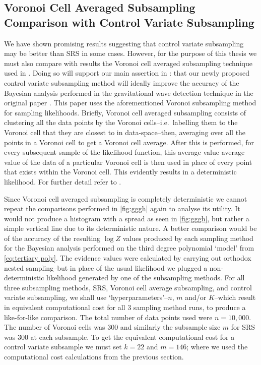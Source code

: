 \subsection{Voronoi Cell Averaged Subsampling Comparison with Control Variate Subsampling}\label{sec:voronoi}


We have shown promising results suggesting that control variate subsampling may be better than SRS in some cases. However, for the purpose of this thesis we must also compare with results the Voronoi cell averaged subsampling technique used in \cite{Mihaylov_2020}. Doing so will support our main assertion in : that our newly proposed control variate subsampling method will ideally improve the accuracy of the Bayesian analysis performed in the gravitational wave detection technique in the original paper \cite{Mihaylov_2020}. This paper uses the aforementioned Voronoi subsampling method for sampling likelihoods. Briefly, Voronoi cell averaged subsampling consists of clustering all the data points by the Voronoi cells--i.e.\ labelling them to the Voronoi cell that they are closest to in data-space--then, averaging over all the points in a Voronoi cell to get a Voronoi cell average. After this is performed, for every subsequent sample of the likelihood function, this average value average value of the data of a particular Voronoi cell is then used in place of every point that exists within the Voronoi cell. This evidently results in a deterministic likelihood. For further detail refer to \cite{Mihaylov_2020}.


Since Voronoi cell averaged subsampling is completely deterministic we cannot repeat the comparisons performed in \cref{fig:gggh} again to analyse its utility. It would not produce a histogram with a spread as seen in \cref{fig:gggh}, but rather a simple vertical line due to its deterministic nature. A better comparison would be of the accuracy of the resulting $\log Z$ values produced by each sampling method for the Bayesian analysis performed on the third degree polynomial `model' from \cref{eq:tertiary poly}. The evidence values were calculated by carrying out orthodox nested sampling--but in place of the usual likelihood we plugged a non-deterministic likelihood generated by one of the subsampling methods. For all three subsampling methods, SRS, Voronoi cell average subsampling, and control variate subsampling, we shall use `hyperparameters'--$n$, $m$ and/or $K$--which result in equivalent computational cost for all 3 sampling method runs, to produce a like-for-like comparison. The total number of data points used were $n=10,000$. The number of Voronoi cells was $300$ and similarly the subsample size $m$ for SRS was $300$ at each subsample. To get the equivalent computational cost for a control variate subsample we must set $k=22$ and $m=146$; where we used the computational cost calculations from the previous section.



